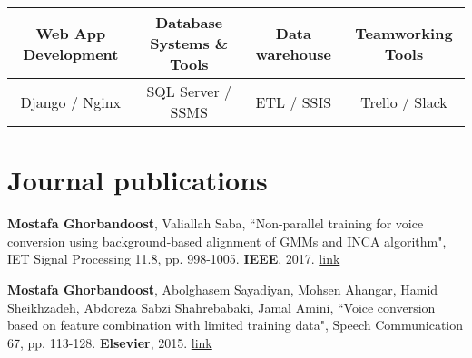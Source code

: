 \documentclass[letterpaper,11pt]{article}
\begin{document}
\begin{table}[h!]
  \begin{center}
    \label{tab:table1}
    \begin{tabular}{c|c|c|c}
      Web App Development \hspace{5pt} & \hspace{5pt} Database Systems \& Tools \hspace{5pt} & \hspace{5pt} Data warehouse \hspace{5pt} & \hspace{5pt} Teamworking Tools \hspace{5pt} \\
      \hline
      Django / Nginx & SQL Server / SSMS &  ETL / SSIS & Trello / Slack \\
    \end{tabular}
  \end{center}
\end{table}

\vspace{-20pt}

\section{Journal publications}
\begin{enumerate}[noitemsep, leftmargin=*,label={[\arabic*]}]
\item{\textbf{Mostafa Ghorbandoost}, Valiallah Saba, ``Non-parallel training for voice conversion using background-based alignment of GMMs and INCA algorithm", IET Signal Processing 11.8, pp. 998-1005. \textbf{IEEE}, 2017. \href{https://ieeexplore.ieee.org/document/8056552}{link}}
\vspace{5pt}
\item{\textbf{Mostafa Ghorbandoost}, Abolghasem Sayadiyan, Mohsen Ahangar, Hamid Sheikhzadeh, Abdoreza Sabzi Shahrebabaki, Jamal Amini, ``Voice conversion based on feature combination with limited training data", Speech Communication 67, pp. 113-128. \textbf{Elsevier}, 2015. \href{https://www.sciencedirect.com/science/article/abs/pii/S0167639314000892}{link}}
\end{enumerate}
\end{document}
